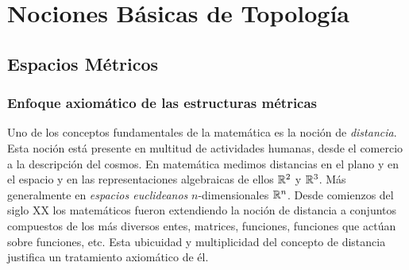 
\chapter{Nociones Básicas de Topología }

\section{Espacios Métricos}

\subsection{Enfoque axiomático de las  estructuras métricas} 
Uno de los conceptos fundamentales de la matemática es la noción de \emph{distancia}. Esta noción está presente en multitud de actividades humanas, desde el comercio a la descripción del cosmos. En matemática medimos distancias en el plano y en el espacio y en las representaciones algebraicas de ellos  $\mathbb{R}^2$ y $\mathbb{R}^3$. Más generalmente  en  \emph{espacios euclideanos} $n$-dimensionales $\mathbb{R}^n$. Desde comienzos del siglo XX los matemáticos fueron extendiendo la noción de distancia a conjuntos compuestos de los más diversos entes, matrices, funciones, funciones que actúan sobre funciones, etc. Esta ubicuidad y multiplicidad del concepto de distancia justifica un tratamiento axiomático de él.








